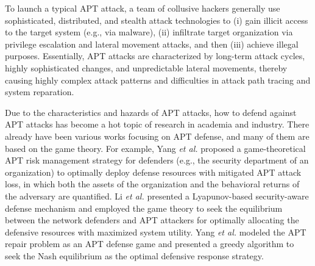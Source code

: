 \documentclass[lettersize,journal]{IEEEtran}
\begin{document}
To launch a typical APT attack, a team of collusive hackers generally use sophisticated, distributed, and stealth attack technologies to (i) gain illicit access to the target system (e.g., via malware), (ii) infiltrate target organization via privilege escalation and lateral movement attacks, and then (iii) achieve illegal purposes.
Essentially, APT attacks are characterized by long-term attack cycles, highly sophisticated changes, and unpredictable lateral movements, thereby causing highly complex attack patterns and difficulties in attack path tracing and system reparation. 

\par
 Due to the characteristics and hazards of APT attacks, how to defend against APT attacks has become a hot topic of research in academia and industry. There already have been various works \cite{yang2018risk,yangEffectiveQuarantineRecovery2021,yangEffectiveRepairStrategy2019,li2018intelligence,li2018defending,zhang2019mathtt,feng2019dynamic} focusing on APT defense, and many of them are based on the game theory. %
 For example, Yang \emph{et al.} \cite{yang2018risk} proposed a game-theoretical APT risk management strategy for defenders (e.g., the security department of an organization) to optimally deploy defense resources with mitigated APT attack loss, in which both the assets of the organization and the behavioral returns of the adversary are quantified. 
Li \emph{et al.} \cite{li2018intelligence} presented a Lyapunov-based security-aware defense mechanism and employed the game theory to seek the equilibrium between the network defenders and APT attackers for optimally allocating the defensive resources with maximized system utility. Yang \emph{et al.} \cite{yangEffectiveRepairStrategy2019} modeled the APT repair problem as an APT defense game and presented a greedy algorithm to seek the Nash equilibrium as the optimal defensive response strategy.\par
\end{document}
